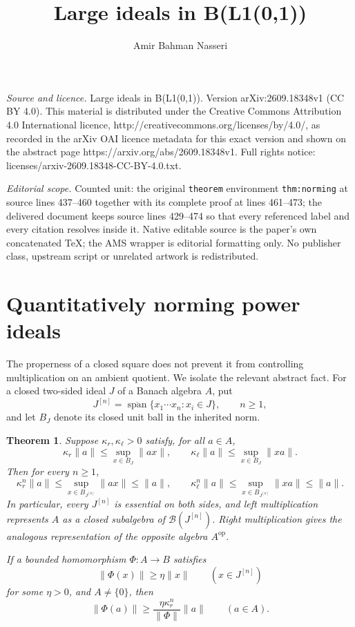 \documentclass[10pt,a4paper]{amsart}
\newtheorem{theorem}{Theorem}[section]
\newcommand{\B}{\mathcal B}
\newcommand{\clspan}{\overline{\operatorname{span}}}
\begin{document}
\title[Large ideals in B(L1(0,1))]{Large ideals in B(L1(0,1))}
\author{Amir Bahman Nasseri}
\date{}
\maketitle
\noindent\emph{Source and licence.} Large ideals in B(L1(0,1)). Version arXiv:2609.18348v1 (CC BY 4.0). This material is distributed under the Creative Commons Attribution 4.0 International licence, http://creativecommons.org/licenses/by/4.0/, as recorded in the arXiv OAI licence metadata for this exact version and shown on the abstract page https://arxiv.org/abs/2609.18348v1. Full rights notice: licenses/arxiv-2609.18348-CC-BY-4.0.txt.\par\smallskip
\noindent\textit{Editorial scope.} Counted unit: the original \texttt{theorem} environment \texttt{thm:norming} at source lines 437--460 together with its complete proof at lines 461--473; the delivered document keeps source lines 429--474 so that every referenced label and every citation resolves inside it. Native editable source is the paper's own concatenated TeX; the AMS wrapper is editorial formatting only. No publisher class, upstream script or unrelated artwork is redistributed.
\section{Quantitatively norming power ideals}\label{sec:norming}

The properness of a closed square does not prevent it from controlling multiplication on an ambient quotient. We isolate the relevant abstract fact. For a closed two-sided ideal $J$ of a Banach algebra $A$, put
\[
 J^{[n]}=\clspan\{x_1\cdots x_n:x_i\in J\},\qquad n\geq1,
\]
and let $B_J$ denote its closed unit ball in the inherited norm.


\begin{theorem}\label{thm:norming}
Suppose $\kappa_r,\kappa_\ell>0$ satisfy, for all $a\in A$,
\begin{equation}\label{eq:detector}
 \kappa_r\|a\|\leq\sup_{x\in B_J}\|ax\|,\qquad
 \kappa_\ell\|a\|\leq\sup_{x\in B_J}\|xa\|.
\end{equation}
Then for every $n\geq1$,
\begin{equation}\label{eq:power-norming}
 \kappa_r^n\|a\|\leq\sup_{x\in B_{J^{[n]}}}\|ax\|\leq\|a\|,
 \qquad
 \kappa_\ell^n\|a\|\leq\sup_{x\in B_{J^{[n]}}}\|xa\|\leq\|a\|.
\end{equation}
In particular, every $J^{[n]}$ is essential on both sides, and left multiplication represents $A$ as a closed subalgebra of $\B(J^{[n]})$. Right multiplication gives the analogous representation of the opposite algebra $A^{\mathrm{op}}$.

If a bounded homomorphism $\Phi:A\to B$ satisfies
\[
 \|\Phi(x)\|\geq\eta\|x\|\qquad(x\in J^{[n]})
\]
for some $\eta>0$, and $A\ne\{0\}$, then
\begin{equation}\label{eq:transfer-lower}
 \|\Phi(a)\|\geq\frac{\eta\kappa_r^n}{\|\Phi\|}\|a\|
 \qquad(a\in A).
\end{equation}
\end{theorem}
\end{document}
